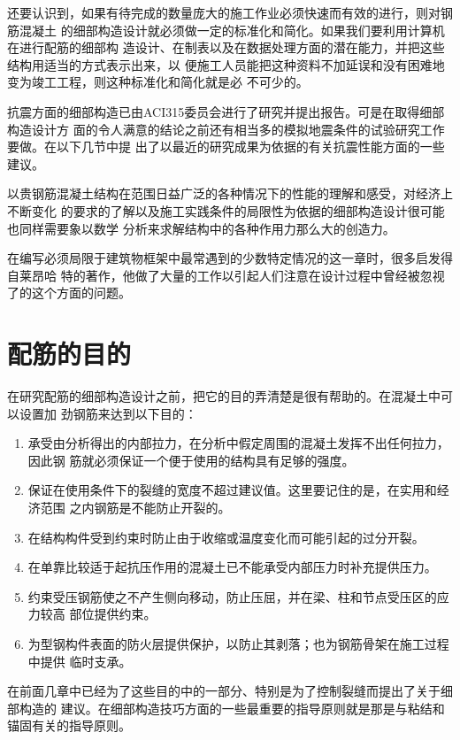 \documentclass[12pt,a4paper]{book}
\begin{document}
还要认识到，如果有待完成的数量庞大的施工作业必须快速而有效的进行，则对钢筋混凝土
的细部构造设计就必须做一定的标准化和简化。如果我们要利用计算机在进行配筋的细部构
造设计、在制表以及在数据处理方面的潜在能力，并把这些结构用适当的方式表示出来，以
便施工人员能把这种资料不加延误和没有困难地变为竣工工程，则这种标准化和简化就是必
不可少的。

抗震方面的细部构造已由ACI315委员会进行了研究并提出报告。可是在取得细部构造设计方
面的令人满意的结论之前还有相当多的模拟地震条件的试验研究工作要做。在以下几节中提
出了以最近的研究成果为依据的有关抗震性能方面的一些建议。

以贵钢筋混凝土结构在范围日益广泛的各种情况下的性能的理解和感受，对经济上不断变化
的要求的了解以及施工实践条件的局限性为依据的细部构造设计很可能也同样需要象以数学
分析来求解结构中的各种作用力那么大的创造力。

在编写必须局限于建筑物框架中最常遇到的少数特定情况的这一章时，很多启发得自莱昂哈
特的著作，他做了大量的工作以引起人们注意在设计过程中曾经被忽视了的这个方面的问题。

\section{配筋的目的}

在研究配筋的细部构造设计之前，把它的目的弄清楚是很有帮助的。在混凝土中可以设置加
劲钢筋来达到以下目的：

\begin{enumerate}
\item 承受由分析得出的内部拉力，在分析中假定周围的混凝土发挥不出任何拉力，因此钢
筋就必须保证一个便于使用的结构具有足够的强度。
\item 保证在使用条件下的裂缝的宽度不超过建议值。这里要记住的是，在实用和经济范围
之内钢筋是不能防止开裂的。
\item 在结构构件受到约束时防止由于收缩或温度变化而可能引起的过分开裂。
\item 在单靠比较适于起抗压作用的混凝土已不能承受内部压力时补充提供压力。
\item 约束受压钢筋使之不产生侧向移动，防止压屈，并在梁、柱和节点受压区的应力较高
部位提供约束。
\item 为型钢构件表面的防火层提供保护，以防止其剥落；也为钢筋骨架在施工过程中提供
临时支承。
\end{enumerate}

在前面几章中已经为了这些目的中的一部分、特别是为了控制裂缝而提出了关于细部构造的
建议。在细部构造技巧方面的一些最重要的指导原则就是那是与粘结和锚固有关的指导原则。
\end{document}
